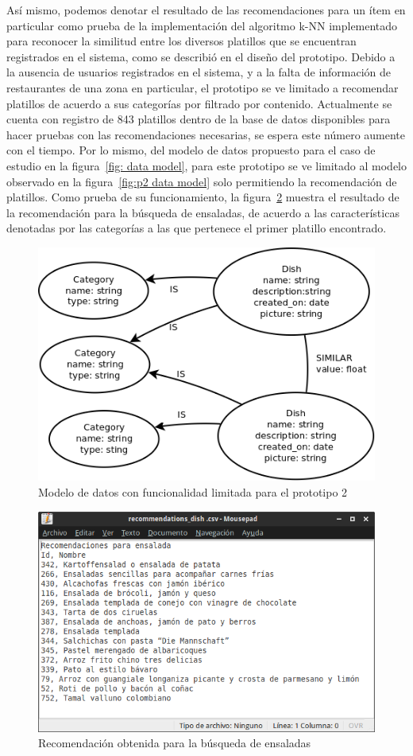     Así mismo, podemos denotar el resultado de las recomendaciones para un ítem en particular como prueba de la implementación del algoritmo k-NN implementado para reconocer la similitud entre los diversos platillos que se encuentran registrados en el sistema, como se describió en el diseño del prototipo. Debido a la ausencia de usuarios registrados en el sistema, y a la falta de información de restaurantes de una zona en particular, el prototipo se ve limitado a recomendar platillos de acuerdo a sus categorías por filtrado por contenido. Actualmente se cuenta con registro de 843 platillos dentro de la base de datos disponibles para hacer pruebas con las recomendaciones necesarias, se espera este número aumente con el tiempo. Por lo mismo, del modelo de datos propuesto para el caso de estudio en la figura~\ref{fig: data model}, para este prototipo se ve limitado al modelo observado en la figura~\ref{fig:p2 data model} solo permitiendo la recomendación de platillos. Como prueba de su funcionamiento, la figura~\ref{fig: screenshot2 p2} muestra el resultado de la recomendación para la búsqueda de ensaladas, de acuerdo a las características denotadas por las categorías a las que pertenece el primer platillo encontrado. 
    
      \begin{figure}[h!]
          \centering
          \includegraphics[width=16cm]{./images/p2_model}
          \caption{Modelo de datos con funcionalidad limitada para el prototipo 2}
          \label{fig: screenshot2 p2}
        \end{figure}

        \begin{figure}[h!]
          \centering
          \includegraphics[width=16cm]{./images/recommendations_dish}
          \caption{Recomendación obtenida para la búsqueda de ensaladas}
          \label{fig: screenshot2 p2}
        \end{figure}